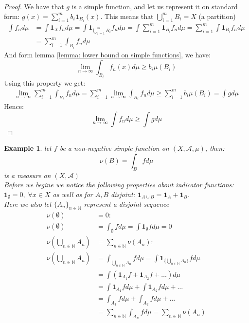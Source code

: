 \documentclass{article}
\newcommand{\N}{\mathbb{N}}
\newcommand{\A}{\mathcal{A}}
\newtheorem{ex}{Example}
\newtheorem{proof}{Proof}
\begin{document}
\begin{proof}
We have that $g$ is a simple function, and let us represent it on standard form: $g(x) = \sum_{i=1}^{m}b_{i}\bm{1}_{B_{i}}(x)$. This means that $\bigcup_{i=1}^{m}B_{i} = X$ (a partition)
\begin{align*}
\int f_{n}d\mu &= \int \bm{1}_{X}f_{n}d\mu =  \int \bm{1}_{\bigcup_{i=1}^{m}B_{i}}f_{n}d\mu = \int \sum_{i=1}^{m}\bm{1}_{B_{i}}f_{n}d\mu = \sum_{i=1}^{m}\int \bm{1}_{B_{i}}f_{n}d\mu \\ 
&= \sum_{i=1}^{m}\int_{B_{i}}f_{n}d\mu
\end{align*}
And form lemma \ref{lemma: lower bound on simple functions}, we have: 
\[\lim_{n\to \infty} \int_{B_{i}}f_{n}(x)d\mu \geq b_{i}\mu(B_{i})
\] 
Using this property we get: 
\begin{align*}
\lim_{n\to \infty} \sum_{i=1}^{m} \int_{B_{i}}f_{n}d\mu = \sum_{i=1}^{m} \lim_{n\to \infty} \int_{B_{i}}f_{n}d\mu \geq \sum_{i=1}^{m} b_{i}\mu(B_{i}) = \int gd\mu 
\end{align*}
Hence: 
\[\lim_{n\to \infty}\int f_{n}d\mu \geq \int gd\mu
\]
\end{proof}

\begin{ex}
let $f$ be a non-negative simple function on $(X,\A, \mu)$, then: 
\[\nu(B) = \int_{B} fd\mu\] 
is a measure on $(X,\A)$\\
Before we begine we notice the following properties about indicator functions: $\bm{1}_{\emptyset} = 0, \; \forall x\in X$ as well as for $A,B$ disjoint: $\bm{1}_{A\cup B} = \bm{1}_{A} + \bm{1}_{B}$. \\ 
Here we also let $\{A_{n}\}_{n\in \N}$ represent a disjoint sequence 
\begin{align*}
\nu(\emptyset) &= 0:\\ 
\nu(\emptyset) &= \int_{\emptyset}fd\mu = \int \bm{1}_{\emptyset}fd\mu = 0 \\
\nu\left(\bigcup_{n\in \N}A_{n}\right) &= \sum_{n\in \N}\nu(A_{n}):\\ 
\nu\left(\bigcup_{n\in \N}A_{n}\right) &= \int_{\bigcup_{n\in \N}A_{n}}fd\mu = \int \bm{1}_{\{\bigcup_{n\in \N}A_{n}\}}fd\mu \\ 
&= \int(\bm{1}_{A_1}f + \bm{1}_{A_2}f + \dots )d\mu \\ 
&= \int \bm{1}_{A_1}fd\mu + \int \bm{1}_{A_2}fd\mu + \dots \\ 
&= \int_{A_1}fd\mu + \int_{A_2}fd\mu + \dots \\ 
&= \sum_{n\in \N}\int_{A_n}fd\mu = \sum_{n\in \N}\nu(A_{n})
\end{align*}
\end{ex}
\end{document}

